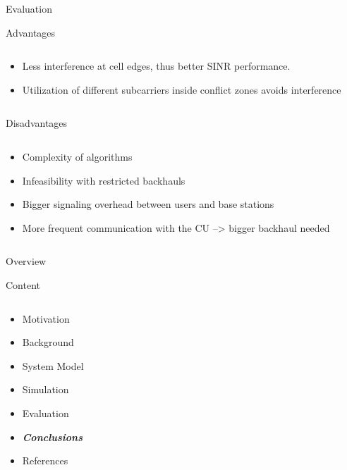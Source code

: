 \documentclass[xcolor={cmyk}]{beamer}
\begin{document}
 \begin{frame}{Evaluation}
	 \begin{block}{Advantages}
	 	\begin{columns}
			\begin{column}{.9\textwidth}
				\begin{itemize}
					\item Less interference at cell edges, thus better SINR performance.
					\item Utilization of different subcarriers inside conflict zones avoids interference
				\end{itemize}
			\end{column}
		\end{columns}
	 \end{block}
	 \begin{block}{Disadvantages}
	 	\begin{columns}
			\begin{column}{.9\textwidth}
				\begin{itemize}
					\item Complexity of algorithms
					\item Infeasibility with restricted backhauls
					\item Bigger signaling overhead between users and base stations
					\item More frequent communication with the CU --> bigger backhaul needed
				\end{itemize}
			\end{column}
		\end{columns}
	 \end{block}
 \end{frame}

 
\begin{frame}{Overview}
	\begin{block}{Content}
		\begin{columns}
			\begin{column}{.9\textwidth}
				\begin{itemize}
					\item Motivation
					\item Background
					\item System Model
					\item Simulation
					\item Evaluation
					\item \textbf{\emph{Conclusions}}
					\item References
				\end{itemize}
			\end{column}
		\end{columns}
	\end{block}
\end{frame}
\end{document}
